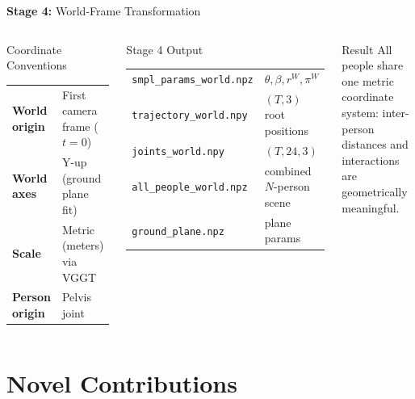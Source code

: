 \documentclass[aspectratio=169,11pt]{beamer}
\newcommand{\stage}[2]{\textcolor{accentblue}{\textbf{Stage #1:}} #2}
\begin{document}
\begin{frame}{\stage{4}{World-Frame Transformation}}
\begin{columns}[T]
      \begin{block}{Coordinate Conventions}
        \footnotesize
        \begin{tabular}{ll}
          \textbf{World origin} & First camera frame ($t\!=\!0$)\\
          \textbf{World axes} & Y-up (ground plane fit)\\
          \textbf{Scale} & Metric (meters) via VGGT\\
          \textbf{Person origin} & Pelvis joint\\
        \end{tabular}
      \end{block}
      \vspace{0.5em}
      \begin{block}{Stage 4 Output}
        \footnotesize
        \begin{tabular}{ll}
          \texttt{smpl\_params\_world.npz} & $\theta, \beta, r^W, \pi^W$\\
          \texttt{trajectory\_world.npy} & $(T,3)$ root positions\\
          \texttt{joints\_world.npy} & $(T,24,3)$\\
          \texttt{all\_people\_world.npz} & combined $N$-person scene\\
          \texttt{ground\_plane.npz} & plane params\\
        \end{tabular}
      \end{block}
      \vspace{0.3em}
      \begin{alertblock}{Result}
        \small All people share one metric coordinate system:
        inter-person distances and interactions are geometrically meaningful.
      \end{alertblock}
  \end{columns}
\end{frame}


\section{Novel Contributions}
\end{document}
